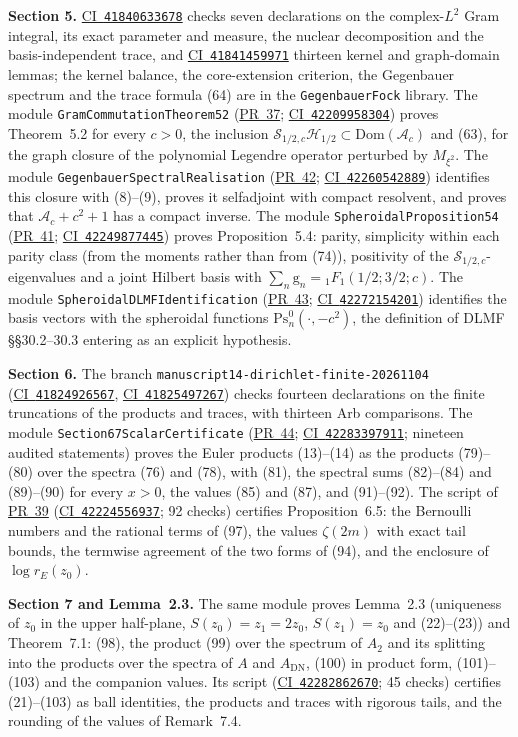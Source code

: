 \documentclass[11pt,a4paper]{article}
\newcommand{\R}{https://github.com/ralfanop/Certifications_Eulerian_polar-curve_computations}
\newcommand{\PR}[1]{\href{\R/pull/#1}{PR~#1}}
\newcommand{\CI}[1]{\href{\R/actions/runs/#1}{CI~\texttt{#1}}}
\newcommand{\eq}[1]{(#1)}
\newcommand{\rE}{r_E}
\begin{document}
\textbf{Section 5.} \CI{41840633678} checks seven declarations on the complex-$L^2$ Gram integral, its exact parameter and measure, the nuclear decomposition and the basis-independent trace, and \CI{41841459971} thirteen kernel and graph-domain lemmas; the kernel balance, the core-extension criterion, the Gegenbauer spectrum and the trace formula \eq{64} are in the \texttt{GegenbauerFock} library. The module \texttt{GramCommutationTheorem52} (\PR{37}; \CI{42209958304}) proves Theorem~5.2 for every $c>0$, the inclusion $\mathcal S_{1/2,c}\mathcal H_{1/2}\subset\mathrm{Dom}(\mathcal A_c)$ and \eq{63}, for the graph closure of the polynomial Legendre operator perturbed by $M_{\xi^2}$. The module \texttt{GegenbauerSpectralRealisation} (\PR{42}; \CI{42260542889}) identifies this closure with \eq{8}--\eq{9}, proves it selfadjoint with compact resolvent, and proves that $\mathcal A_c+c^2+1$ has a compact inverse. The module \texttt{SpheroidalProposition54} (\PR{41}; \CI{42249877445}) proves Proposition~5.4: parity, simplicity within each parity class (from the moments rather than from \eq{74}), positivity of the $\mathcal S_{1/2,c}$-eigenvalues and a joint Hilbert basis with $\sum_n\mathrm g_n={}_1F_1(1/2;3/2;c)$. The module \texttt{SpheroidalDLMFIdentification} (\PR{43}; \CI{42272154201}) identifies the basis vectors with the spheroidal functions $\mathrm{Ps}_n^0(\cdot,-c^2)$, the definition of DLMF \S\S30.2--30.3 entering as an explicit hypothesis.

\textbf{Section 6.} The branch \texttt{manuscript14-dirichlet-finite-20261104} (\CI{41824926567}, \CI{41825497267}) checks fourteen declarations on the finite truncations of the products and traces, with thirteen Arb comparisons. The module \texttt{Section67ScalarCertificate} (\PR{44}; \CI{42283397911}; nineteen audited statements) proves the Euler products \eq{13}--\eq{14} as the products \eq{79}--\eq{80} over the spectra \eq{76} and \eq{78}, with \eq{81}, the spectral sums \eq{82}--\eq{84} and \eq{89}--\eq{90} for every $x>0$, the values \eq{85} and \eq{87}, and \eq{91}--\eq{92}. The script of \PR{39} (\CI{42224556937}; 92 checks) certifies Proposition~6.5: the Bernoulli numbers and the rational terms of \eq{97}, the values $\zeta(2m)$ with exact tail bounds, the termwise agreement of the two forms of \eq{94}, and the enclosure of $\log\rE(z_0)$.

\textbf{Section 7 and Lemma~2.3.} The same module proves Lemma~2.3 (uniqueness of $z_0$ in the upper half-plane, $S(z_0)=z_1=2z_0$, $S(z_1)=z_0$ and \eq{22}--\eq{23}) and Theorem~7.1: \eq{98}, the product \eq{99} over the spectrum of $A_2$ and its splitting into the products over the spectra of $A$ and $A_{\mathrm{DN}}$, \eq{100} in product form, \eq{101}--\eq{103} and the companion values. Its script (\CI{42282862670}; 45 checks) certifies \eq{21}--\eq{103} as ball identities, the products and traces with rigorous tails, and the rounding of the values of Remark~7.4.
\end{document}
